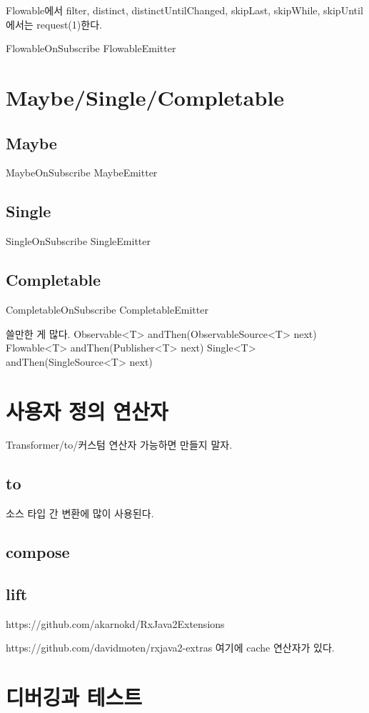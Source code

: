 \documentclass{book}
\begin{document}
{Flowable에서 filter, distinct, distinctUntilChanged, skipLast, skipWhile, skipUntil 에서는 request(1)한다.

FlowableOnSubscribe
FlowableEmitter

\chapter{Maybe/Single/Completable}

\section{Maybe}
MaybeOnSubscribe
MaybeEmitter
\section{Single}
SingleOnSubscribe
SingleEmitter

\section{Completable}
CompletableOnSubscribe
CompletableEmitter

쓸만한 게 많다.
Observable<T> andThen(ObservableSource<T> next)
Flowable<T> andThen(Publisher<T> next)
Single<T> andThen(SingleSource<T> next)
 

\chapter{사용자 정의 연산자}
Transformer/to/커스텀 연산자
가능하면 만들지 말자.

\section{to}
소스 타입 간 변환에 많이 사용된다.

\section{compose}


\section{lift}

https://github.com/akarnokd/RxJava2Extensions

https://github.com/davidmoten/rxjava2-extras
여기에 cache 연산자가 있다.



\chapter{디버깅과 테스트}	
}
\end{document}
